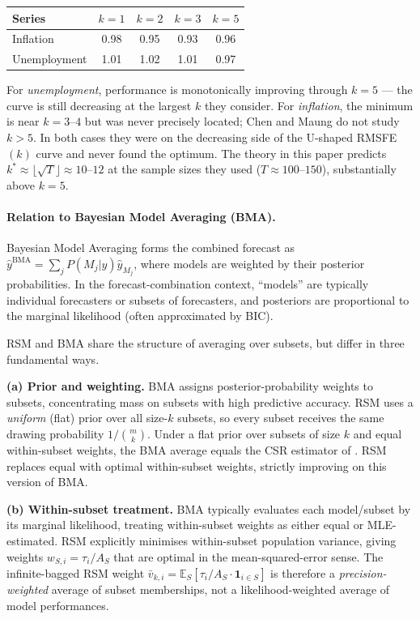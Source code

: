 \documentclass[12pt,a4paper]{article}
\theoremstyle{definition}
\newcommand{\E}{\mathbb{E}}
\begin{document}
\begin{center}
\begin{tabular}{lcccc}
\toprule
Series & $k=1$ & $k=2$ & $k=3$ & $k=5$ \\
\midrule
Inflation    & 0.98 & 0.95 & 0.93 & 0.96 \\
Unemployment & 1.01 & 1.02 & 1.01 & 0.97 \\
\bottomrule
\end{tabular}
\end{center}

For \emph{unemployment}, performance is monotonically improving through
$k=5$ --- the curve is still decreasing at the largest $k$ they consider.
For \emph{inflation}, the minimum is near $k=3$--$4$ but was never
precisely located; Chen and Maung do not study $k>5$.  In both cases they
were on the decreasing side of the U-shaped RMSFE$(k)$ curve and never
found the optimum.  The theory in this paper predicts
$k^*\approx\lfloor\sqrt{T}\rfloor\approx 10$--$12$ at the sample sizes
they used ($T\approx100$--$150$), substantially above $k=5$.

\paragraph{Relation to Bayesian Model Averaging (BMA).}
Bayesian Model Averaging \citep{Raftery1997,HoetingEtAl1999} forms the
combined forecast as
$\hat y^{\mathrm{BMA}}=\sum_j P(M_j|y)\hat y_{M_j}$,
where models are weighted by their posterior probabilities.  In the
forecast-combination context, ``models'' are typically individual
forecasters or subsets of forecasters, and posteriors are proportional
to the marginal likelihood (often approximated by BIC).

RSM and BMA share the structure of averaging over subsets, but differ
in three fundamental ways.

\textbf{(a) Prior and weighting.}  BMA assigns posterior-probability
weights to subsets, concentrating mass on subsets with high predictive
accuracy.  RSM uses a \emph{uniform} (flat) prior over all size-$k$ subsets,
so every subset receives the same drawing probability $1/\binom{m}{k}$.
Under a flat prior over subsets of size $k$ and equal within-subset weights,
the BMA average equals the CSR estimator of \citet{ElliottGarganoTimmermann2013}.
RSM replaces equal with optimal within-subset weights, strictly improving
on this version of BMA.

\textbf{(b) Within-subset treatment.}  BMA typically evaluates each
model/subset by its marginal likelihood, treating within-subset weights as
either equal or MLE-estimated.  RSM explicitly minimises within-subset
population variance, giving weights $w_{S,i}=\tau_i/A_S$ that are optimal
in the mean-squared-error sense.  The infinite-bagged RSM weight
$\bar v_{k,i}=\E_S[\tau_i/A_S\cdot\mathbf{1}_{i\in S}]$ is therefore a
\emph{precision-weighted} average of subset memberships, not a
likelihood-weighted average of model performances.
\end{document}

